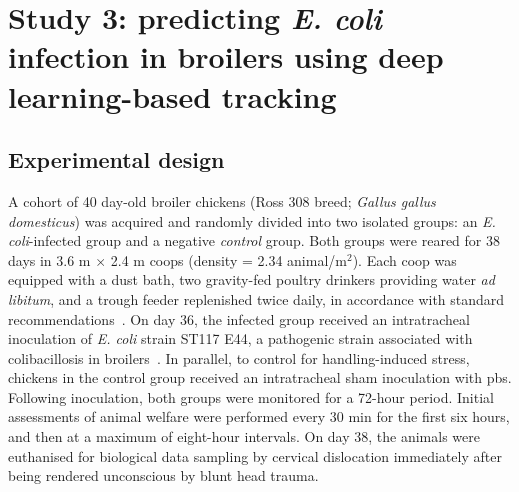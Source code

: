 
\clearpage

\section{Study 3: predicting \textit{E. coli} infection in broilers using deep learning-based tracking}

\subsection{Experimental design}

A cohort of 40 day-old broiler chickens (Ross 308 breed; \textit{Gallus gallus domesticus}) was acquired and randomly divided into two isolated groups: an \textit{E. coli}-infected group and a negative \textit{control} group. Both groups were reared for 38 days in 3.6 m $\times$ 2.4 m coops (density = 2.34 animal/m$^2$). Each coop was equipped with a dust bath, two gravity-fed poultry drinkers providing water \textit{ad libitum}, and a trough feeder replenished twice daily, in accordance with standard recommendations~\cite{ross308, scheidwasser2025c}. On day 36, the infected group received an intratracheal inoculation of \textit{E. coli} strain ST117 E44, a pathogenic strain associated with colibacillosis in broilers~\cite{olsen2011, ronco2017, kromann2021}. In parallel, to control for handling-induced stress, chickens in the control group received an intratracheal sham inoculation with \gls{pbs}. Following inoculation, both groups were monitored for a 72-hour period. Initial assessments of animal welfare were performed every 30 min for the first six hours, and then at a maximum of eight-hour intervals. On day 38, the animals were euthanised for biological data sampling by cervical dislocation immediately after being rendered unconscious by blunt head trauma.

